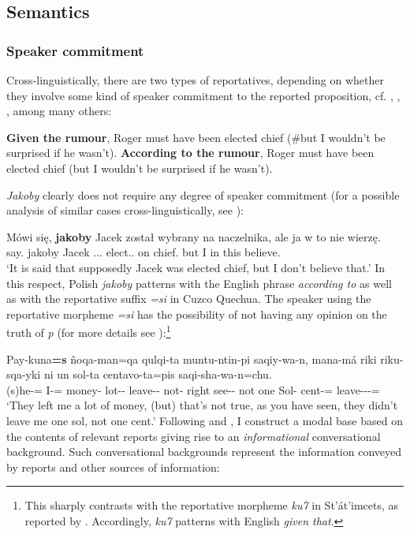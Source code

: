 \documentclass[output=paper
,modfonts
,nonflat]{langsci/langscibook}
\begin{document}
\subsection{Semantics}

\subsubsection{Speaker commitment}
Cross-linguistically, there are two types of reportatives, depending on whether they involve some kind of speaker commitment to the reported proposition, cf. \textcite{Faller2011}, \textcite{Kratzer2012}, \textcite{Murray2017}, among many others:

\ea	\ea	\textbf{Given the rumour}, Roger must have been elected chief (\#but I wouldn't be surprised if he wasn't).
	\ex	\textbf{According to the rumour}, Roger must have been elected chief (but I wouldn't be surprised if he wasn't). 
\z\z

\noindent \emph{Jakoby} clearly does not require any degree of speaker commitment (for a possible analysis of similar cases cross-linguistically, see \textcite{AnderBois2014}):

\ea \gll Mówi się, \textbf{jakoby} Jacek został wybrany na naczelnika, ale ja w to nie wierzę. \\
		say.{\thirdperson}{\sg} {} jakoby Jacek  {\passaux}.{\lptcp}.{\sg}.{\masc} elect.{\ptcp}.{\masc} on chief.{\acc} but I in this {\negation} believe.{\firstperson}{\sg} \\
\glt	`It is said that supposedly Jacek was elected chief, but I don't believe that.' 
\z
In this respect, Polish \emph{jakoby} patterns with the English phrase \emph{according to} as well as with the reportative suffix \emph{=si} in Cuzco Quechua. The speaker using the reportative morpheme \emph{=si} has the possibility of not having any opinion on the truth of \emph{p} (for more details see \textcite{Faller2011}):\footnote{
This sharply contrasts with the reportative morpheme \emph{ku7} in St'át'imcets, as reported by \textcite{Lisa-Matthewson-Davis2017}. Accordingly, \emph{ku7} patterns with English \emph{given that}.  
}

\ea \gll Pay-kuna\textbf{=s} ñoqa-man=qa qulqi-ta muntu-ntin-pi saqiy-wa-n, mana-má riki riku-sqa-yki ni un sol-ta centavo-ta=pis saqi-sha-wa-n=chu. \\
		(s)he-{\pl}={\rep} I-{\illa}={\topi} money-{\acc} lot-{\incl}-{\loc} leave-{\firstperson}{\object}-{\thirdperson} not-{\impr} right see-{\ptcp}-{\secondperson} not one Sol-{\acc} cent-{\acc}={\add} leave-{\prog}-{\firstperson}{\object}-{\thirdperson}={\negation} \\
\glt	 `They left me a lot of money, (but) that's not true, as you have seen, they didn't leave me one sol, not one cent.' 
\z
Following \textcite{Kratzer2012} and \textcite{Faller2011}, I construct a modal base based on the contents of relevant reports giving rise to an \emph{informational} conversational background. Such conversational backgrounds represent the information conveyed by reports and other sources of information:
\end{document}
